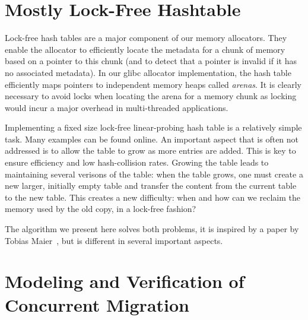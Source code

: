 \documentclass[twoside,12pt]{cslreport}
\begin{document}





\chapter{Mostly Lock-Free Hashtable}
\label{algorithm-details}

Lock-free hash tables are a major component of our memory
allocators. They enable the allocator to efficiently locate the
metadata for a chunk of memory based on a pointer to this chunk (and
to detect that a pointer is invalid if it has no associated metadata).
In our glibc allocator implementation, the hash table efficiently maps
pointers to independent memory heaps called \emph{arenas}. It is
clearly necessary to avoid locks when locating the arena for a memory
chunk as locking would incur a major overhead in multi-threaded applications.

Implementing a fixed size lock-free linear-probing hash table is a
relatively simple task. Many examples can be found online. An
important aspect that is often not addressed is to allow the table to
grow as more entries are added. This is key to ensure efficiency and
low hash-collision rates. Growing the table leads to maintaining
several verisons of the table: when the table grows, one must create a
new larger, initially empty table and transfer the content from the
current table to the new table. This creates a new difficulty: when
and how can we reclaim the memory used by the old copy, in a lock-free
fashion?

The algorithm we present here solves both problems, it is inspired by
a paper by Tobias Maier~\cite{MaierSD16}, but is different in several
important aspects.





\chapter{Modeling and Verification of Concurrent Migration}
\label{verif}




\end{document}
